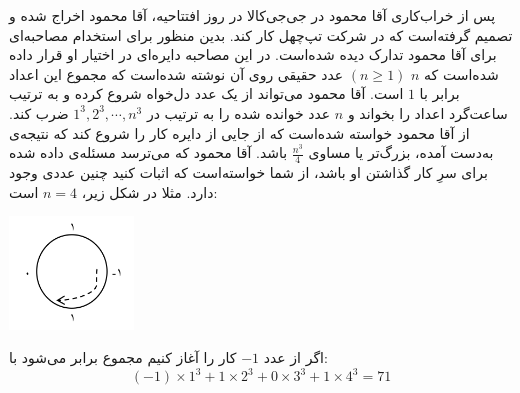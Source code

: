 \EXERCISE
پس از خراب‌کاری آقا محمود در جی‌جی‌کالا در روز افتتاحیه، آقا محمود اخراج شده و تصمیم گرفته‌است که در شرکت تپ‌چهل کار کند. بدین منظور برای استخدام مصاحبه‌ای برای آقا محمود تدارک دیده شده‌است. در این مصاحبه دایره‌ای در اختیار او قرار داده شده‌است که
$n$
$(n \geq 1)$
عدد حقیقی روی آن نوشته شده‌است که مجموع این اعداد برابر با
$1$
است. آقا محمود می‌تواند از یک عدد دل‌خواه شروع کرده و به ترتیب ساعت‌گرد اعداد را بخواند و
$n$
عدد خوانده شده را به ترتیب در
$1^3, 2^3, \cdots, n^3$
ضرب کند. از آقا محمود خواسته شده‌است که از جایی از دایره کار را شروع کند که نتیجه‌ی به‌دست آمده، بزرگ‌تر یا مساوی
$\frac{n^3}{4}$
باشد. آقا محمود که می‌ترسد مسئله‌ی داده شده برای سرِ کار گذاشتن او باشد، از شما خواسته‌است که اثبات کنید چنین عددی وجود دارد. مثلا در شکل زیر،
$n = 4$
است:
\begin{center}
\includegraphics[height=3cm]{8.png}
\end{center}
اگر از عدد
$-1$
کار را آغاز کنیم مجموع برابر می‌شود با:
$$(-1) \times 1^3 + 1 \times 2^3 + 0 \times 3^3 + 1 \times 4^3 = 71$$